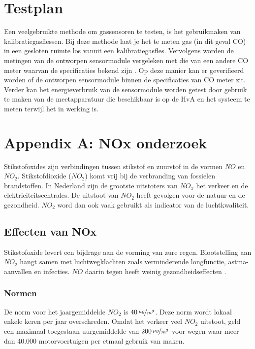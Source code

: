 \documentclass[a4paper, 11pt]{article} %
\begin{document}
	\section{Testplan}
	Een veelgebruikte methode om gassensoren te testen, is het gebruikmaken van kalibratiegasflessen. Bij deze methode laat je het te meten gas (in dit geval CO) in een gesloten ruimte los vanuit een kalibratiegasfles. Vervolgens worden de metingen van de ontworpen sensormodule vergeleken met die van een andere CO meter waarvan de specificaties bekend zijn \cite{Hatech}. Op deze manier kan er geverifieerd worden of de ontworpen sensormodule binnen de specificaties van CO meter zit. Verder kan het energieverbruik van de sensormodule worden getest door gebruik te maken van de meetapparatuur die beschikbaar is op de HvA en het systeem te meten terwijl het in werking is.
	\newpage
	\appendix
	\section{Appendix A: NOx onderzoek}
	Stikstofoxides zijn verbindingen tussen stikstof en zuurstof in de vormen $NO$ en $NO_2$. Stikstofdioxide ($NO_2$) komt vrij bij de verbranding van fossielen brandstoffen. In Nederland zijn de grootste uitstoters van $NO_x$ het verkeer en de elektriciteitscentrales.  De uitstoot van $NO_2$ heeft gevolgen voor de natuur en de gezondheid. $NO_2$ word dan ook vaak gebruikt als indicator van de luchtkwaliteit.
	
	\subsection{Effecten van NOx}
	Stikstofoxide levert een bijdrage aan de vorming van zure regen. Blootstelling aan $NO_2$ hangt samen met luchtwegklachten zoals verminderende longfunctie, astma-aanvallen en infecties. $NO$ daarin tegen heeft weinig gezondheidseffecten \cite{NO2_Amsterdam}. 
	
	
	\subsubsection{Normen}
	De norm voor het jaargemiddelde $NO_2$ is 	$40\,\nicefrac{\mu g}{m^{3}}$. Deze norm wordt lokaal enkele keren per jaar overschreden. Omdat het verkeer veel $NO_2$ uitstoot, geld een maximaal toegestaan uurgemiddelde van $200\,\nicefrac{\mu g}{m^{3}}$ voor wegen waar meer dan 40.000 motorvoertuigen per etmaal gebruik van maken.
	
\end{document}
